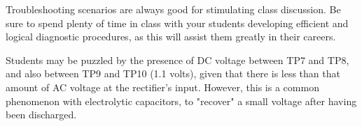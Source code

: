 





Troubleshooting scenarios are always good for stimulating class discussion.  Be sure to spend plenty of time in class with your students developing efficient and logical diagnostic procedures, as this will assist them greatly in their careers.

Students may be puzzled by the presence of DC voltage between TP7 and TP8, and also between TP9 and TP10 (1.1 volts), given that there is less than that amount of AC voltage at the rectifier's input.  However, this is a common phenomenon with electrolytic capacitors, to "recover" a small voltage after having been discharged.




